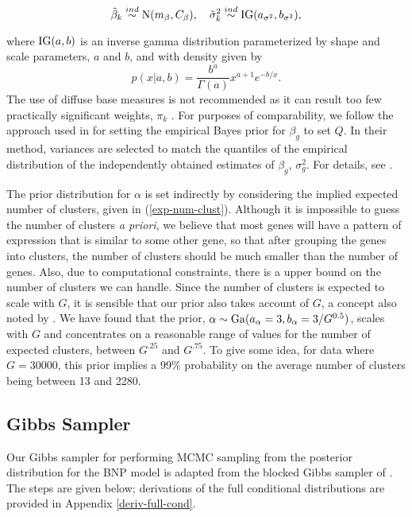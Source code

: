 \begin{equation}
\tilde{\beta}_k \stackrel{ind}{\sim} \operatorname{N}(m_\beta, C_\beta),\quad \tilde{\sigma}^2_k \stackrel{ind}{\sim} \operatorname{IG}(a_{\sigma^2}, b_{\sigma^2}),
\end{equation}

where $\operatorname{IG}(a,b)$ is an inverse gamma distribution parameterized by shape and scale parameters, $a$ and $b$, and with density given by
\begin{equation*}
p(x|a,b) = \frac{b^a}{\Gamma(a)}x^{a+1}e^{-b/x}.
\end{equation*}
The use of diffuse base measures is not recommended as it can result too few practically significant weights, $\pi_k$ \citep[p.554]{gelman-book}. For purposes of comparability, we follow the approach used in \cite{deseq2014} for setting the empirical Bayes prior for $\beta_g$ to set $Q$. In their method, variances are selected to match the quantiles of the empirical distribution of the independently obtained estimates of $\beta_g$, $\sigma_g^2$. For details, see \citet[p.17]{deseq2014}.

The prior distribution for $\alpha$ is set indirectly by considering the implied expected number of clusters, given in (\ref{exp-num-clust}). Although it is impossible to guess the number of clusters \textit{a priori}, we believe that most genes will have a pattern of expression that is similar to some other gene, so that after grouping the genes into clusters, the number of clusters should be much smaller than the number of genes. Also, due to computational constraints, there is a upper bound on the number of clusters we can handle. Since the number of clusters is expected to scale with $G$, it is sensible that our prior also takes account of $G$, a concept also noted by \citet{escobar1994}. We have found that the prior, $\alpha \sim \operatorname{Ga}(a_\alpha=3,b_\alpha=3/G^{0.5})$, scales with $G$ and concentrates on a reasonable range of values for the number of expected clusters, between $G^{.25}$ and $G^{.75}$. To give some idea, for data where $G=30000$, this prior implies a 99\% probability on the average number of clusters being between 13 and 2280.


\subsection{Gibbs Sampler}
Our Gibbs sampler for performing MCMC sampling from the posterior distribution for the BNP model is adapted from the blocked Gibbs sampler of \citet{ishwaran2000}. The steps are given below; derivations of the full conditional distributions are provided in Appendix \ref{deriv-full-cond}.

